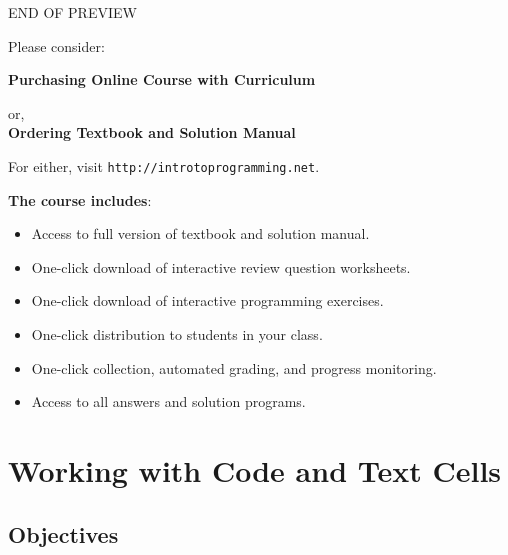 \newpage
\iffullversion
\else
\vbox{}
\vfill
\pagestyle{empty}
    \begin{center}
    {\huge \color{red}END OF PREVIEW}\\[2cm]

\centerline{\Large Please consider:}
\vspace{1cm}

{\Large \bf Purchasing Online Course with Curriculum}
\vspace{1cm}

    {\Large or,}\\[1cm]

{\Large \bf Ordering Textbook and Solution Manual}
\vspace{1cm}

    {\Large For either, visit {\tt http://introtoprogramming.net}. \\[2cm]
}
\end{center}
{\bf The course includes}:
\begin{itemize}
\item Access to full version of textbook and solution manual.
\item One-click download of interactive review question worksheets.
\item One-click download of interactive programming exercises.
\item One-click distribution to students in your class.
\item One-click collection, automated grading, and progress monitoring.
\item Access to all answers and solution programs.
\end{itemize}

\vfill
    
\fi




\section{Working with Code and Text Cells} \label{sec:editmenu}

\subsection{Objectives} 
 
